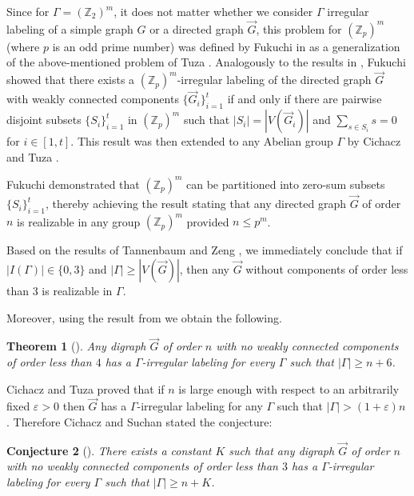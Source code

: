 \documentclass{article}
\newcommand{\zet}{\mathbb{Z}}
\newtheorem{thm}{Theorem}[section]
\newtheorem{conj}[thm]{Conjecture}
\begin{document}
Since for $\Gamma=(\zet_2)^m$, it does not matter whether we consider $\Gamma$ irregular labeling of a simple graph $G$ or a directed graph $\overrightarrow{G}$, this problem for $(\zet_p)^m$
  (where $p$ is an odd prime number) was defined by Fukuchi in \cite{Fukuchi} as a generalization of the above-mentioned problem of Tuza \cite{Tuza}. Analogously to the results in \cite{CaccJia, Egawa}, Fukuchi showed that there exists a  $(\zet_p)^m$-irregular labeling of the directed graph $\overrightarrow{G}$   with weakly connected components $\{\overrightarrow{G}_i\}_{i=1}^t$
  if and only if there are pairwise disjoint subsets 
 $\{S_i\}_{i=1}^t$   in  $(\zet_p)^m$   such that 
 $|S_i|=|V(\overrightarrow{G}_i)|$ and $\sum_{s\in S_i}s=0$ for $i\in[1,t]$. This result was then extended to any Abelian group $\Gamma$ by Cichacz and Tuza  \cite{CicTuz}.
 
 Fukuchi demonstrated that 
$(\zet_p)^m$ can be partitioned into zero-sum subsets $\{S_i\}_{i=1}^t$, thereby achieving the result stating that any directed graph $\overrightarrow{G}$
  of order $n$ is realizable in any group $(\zet_p)^m$
  provided $n\leq p^m$. 

Based on the results of Tannenbaum \cite{Tannenbaum1} and Zeng \cite{Zeng}, we immediately conclude that if $|I(\Gamma)|\in\{0,3\}$ and $|\Gamma|\geq |V(\overrightarrow{G})|$, then any 
 $\overrightarrow{G}$
  without components of order less than $3$ is realizable in  $\Gamma$.


Moreover, using the result from \cite{Cicir,CicrSuch,CicrSuch2} we obtain the following.
\begin{thm}[\cite{Cicir,CicrSuch,CicrSuch2}] Any digraph\/ $\overrightarrow{G}$ of order\/ $n$ with no weakly connected components
 of order less than\/ $4$ has a $\Gamma$-irregular labeling for every\/ $\Gamma$ such that\/
   $|\Gamma|\geq n+6$.\end{thm}
Cichacz and Tuza proved that if  $n$ is large enough
with respect to an arbitrarily fixed $\varepsilon > 0$ then $\overrightarrow{G}$
has a $\Gamma$-irregular labeling for any $\Gamma$ such that $|\Gamma|>(1+\varepsilon)n$ \cite{CicTuz}. 
Therefore Cichacz and Suchan stated the conjecture:

\begin{conj}[\cite{CicrSuch2}]\label{hipotezaK}There exists a constant $K$ such that any digraph\/ $\overrightarrow{G}$ of order\/ $n$ with no weakly connected components
 of order less than\/ $3$ has a $\Gamma$-irregular labeling for every\/ $\Gamma$ such that $|\Gamma|\geq n+K$.
\end{conj}
\end{document}
